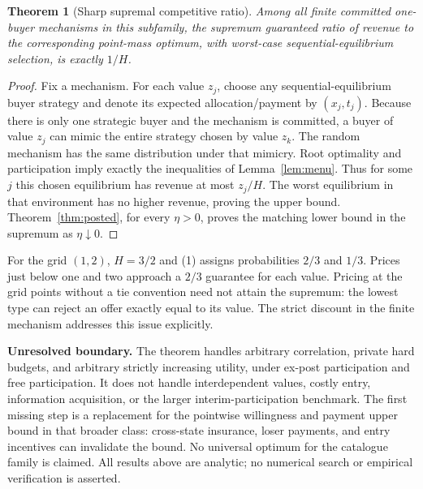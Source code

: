 \documentclass[11pt]{article}
\newtheorem{theorem}{Theorem}
\theoremstyle{remark}\newtheorem{remark}[theorem]{Remark}
\begin{document}
\begin{theorem}[Sharp supremal competitive ratio]\label{thm:sharp}
Among all finite committed one-buyer mechanisms in this subfamily, the supremum guaranteed ratio of revenue to the corresponding point-mass optimum, with worst-case sequential-equilibrium selection, is exactly $1/H$.
\end{theorem}
\begin{proof}
Fix a mechanism. For each value $z_j$, choose any sequential-equilibrium buyer strategy and denote its expected allocation/payment by $(x_j,t_j)$. Because there is only one strategic buyer and the mechanism is committed, a buyer of value $z_j$ can mimic the entire strategy chosen by value $z_k$. The random mechanism has the same distribution under that mimicry. Root optimality and participation imply exactly the inequalities of Lemma~\ref{lem:menu}. Thus for some $j$ this chosen equilibrium has revenue at most $z_j/H$. The worst equilibrium in that environment has no higher revenue, proving the upper bound. Theorem~\ref{thm:posted}, for every $\eta>0$, proves the matching lower bound in the supremum as $\eta\downarrow0$.
\end{proof}

For the grid $(1,2)$, $H=3/2$ and (1) assigns probabilities $2/3$ and $1/3$. Prices just below one and two approach a $2/3$ guarantee for each value. Pricing at the grid points without a tie convention need not attain the supremum: the lowest type can reject an offer exactly equal to its value. The strict discount in the finite mechanism addresses this issue explicitly.

\textbf{Unresolved boundary.} The theorem handles arbitrary correlation, private hard budgets, and arbitrary strictly increasing utility, under ex-post participation and free participation. It does not handle interdependent values, costly entry, information acquisition, or the larger interim-participation benchmark. The first missing step is a replacement for the pointwise willingness and payment upper bound in that broader class: cross-state insurance, loser payments, and entry incentives can invalidate the bound. No universal optimum for the catalogue family is claimed. All results above are analytic; no numerical search or empirical verification is asserted.
\end{document}
